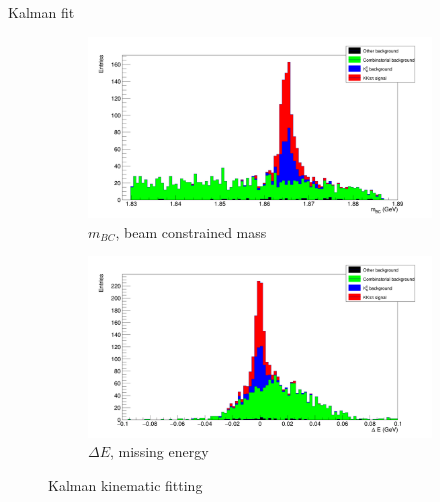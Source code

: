 \documentclass{beamer}
\begin{document}
\begin{frame}{Kalman fit}
  \begin{figure}
    \centering
    \begin{subfigure}{0.5\textwidth}
      \centering
      \includegraphics[width=\textwidth]{MBC_Composition_Kalman.png}
      \caption{$m_{BC}$, beam constrained mass}
    \end{subfigure}%
    \begin{subfigure}{0.5\textwidth}
      \centering
      \includegraphics[width=\textwidth]{DeltaE_Composition_Kalman.png}
      \caption{$\Delta E$, missing energy}
    \end{subfigure}
    \caption{Kalman kinematic fitting}
  \end{figure}
\end{frame}
\end{document}
